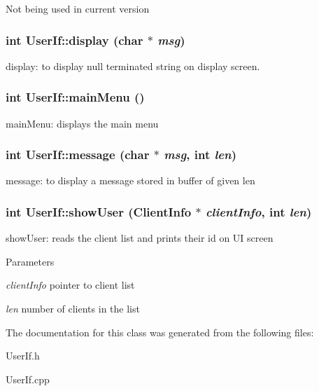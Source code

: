 Not being used in current version \hypertarget{classUserIf_a59cf40b6f9ee11f0773ec1939ea42d53}{
\subsubsection[{display}]{\setlength{\rightskip}{0pt plus 5cm}int UserIf::display (char $\ast$ {\em msg})}}
\label{classUserIf_a59cf40b6f9ee11f0773ec1939ea42d53}
display: to display null terminated string on display screen. \hypertarget{classUserIf_a2e8d3d8d85a683762f1caa0cac4f9f0c}{
\subsubsection[{mainMenu}]{\setlength{\rightskip}{0pt plus 5cm}int UserIf::mainMenu ()}}
\label{classUserIf_a2e8d3d8d85a683762f1caa0cac4f9f0c}
mainMenu: displays the main menu \hypertarget{classUserIf_a7792572195cdb2ced9d74177e45bdc6e}{
\subsubsection[{message}]{\setlength{\rightskip}{0pt plus 5cm}int UserIf::message (char $\ast$ {\em msg}, \/  int {\em len})}}
\label{classUserIf_a7792572195cdb2ced9d74177e45bdc6e}
message: to display a message stored in buffer of given len \hypertarget{classUserIf_a9949473878f6f561d33d068ac5325ad2}{
\subsubsection[{showUser}]{\setlength{\rightskip}{0pt plus 5cm}int UserIf::showUser ({\bf ClientInfo} $\ast$ {\em clientInfo}, \/  int {\em len})}}
\label{classUserIf_a9949473878f6f561d33d068ac5325ad2}
showUser: reads the client list and prints their id on UI screen


\begin{DoxyParams}{Parameters}
\item[{\em clientInfo}]pointer to client list \item[{\em len}]number of clients in the list \end{DoxyParams}


The documentation for this class was generated from the following files:\begin{DoxyCompactItemize}
\item 
UserIf.h\item 
UserIf.cpp\end{DoxyCompactItemize}
